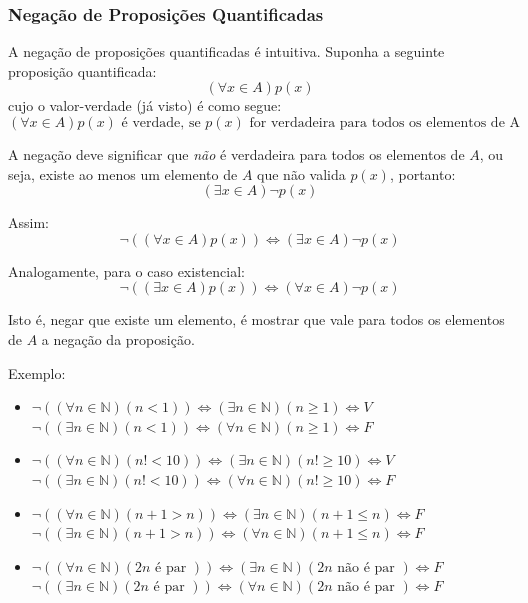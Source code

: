 \documentclass[oneside,a4paper,12pt]{article}
\begin{document}
\subsubsection{Negação de Proposições Quantificadas}

A negação de proposições quantificadas é intuitiva. Suponha a seguinte proposição quantificada:
$$(\forall x \in A)p(x)$$ cujo o valor-verdade (já visto) é como segue:
$$(\forall x \in A)p(x) \text{ é verdade, se } p(x) \text{ for verdadeira para todos os elementos de A}$$

A negação deve significar que {\it não} é verdadeira para todos os elementos de $A$, ou seja, existe ao menos um elemento de $A$ que não valida $p(x)$, portanto:
$$(\exists x \in A) \neg p(x)$$

Assim:
$$\neg ((\forall x \in A)p(x)) \Leftrightarrow (\exists x \in A) \neg p(x)$$

Analogamente, para o caso existencial:
$$\neg ((\exists x \in A)p(x)) \Leftrightarrow (\forall x \in A) \neg p(x)$$

Isto é, negar que existe um elemento, é mostrar que vale para todos os elementos de $A$ a negação da proposição.

Exemplo:

\begin{itemize}
	\item $\neg ((\forall n \in \mathbb{N})(n<1)) \Leftrightarrow (\exists n \in \mathbb{N})(n \geq 1) \Leftrightarrow V$
	\\ $\neg ((\exists n \in \mathbb{N})(n<1)) \Leftrightarrow (\forall n \in \mathbb{N})(n \geq 1) \Leftrightarrow F$
	\item $\neg((\forall n \in \mathbb{N})(n! < 10)) \Leftrightarrow (\exists n \in \mathbb{N})(n! \geq 10) \Leftrightarrow V$ \\
	$\neg((\exists n \in \mathbb{N})(n! < 10)) \Leftrightarrow (\forall n \in \mathbb{N})(n! \geq 10) \Leftrightarrow F$
	\item $\neg ((\forall n \in \mathbb{N})(n+1>n)) \Leftrightarrow (\exists n \in \mathbb{N})(n+1 \leq n) \Leftrightarrow F$ \\
	$\neg ((\exists n \in \mathbb{N})(n+1>n)) \Leftrightarrow (\forall n \in \mathbb{N})(n+1 \leq n) \Leftrightarrow F$ 
	\item $\neg ((\forall n \in \mathbb{N})(2n \text{ é par })) \Leftrightarrow (\exists n \in \mathbb{N})(2n \text{ não é par }) \Leftrightarrow F$ \\
	$\neg ((\exists n \in \mathbb{N})(2n \text{ é par })) \Leftrightarrow (\forall n \in \mathbb{N})(2n \text{ não é par }) \Leftrightarrow F$
\end{itemize}
\end{document}
